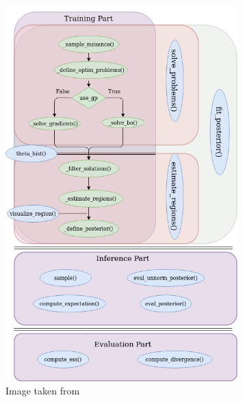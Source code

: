 \begin{figure}[!ht]
    \begin{center}
      \includegraphics[width=0.8\textwidth]{./graphs/ROMC.png}
    \end{center}
    \caption{Image taken from \cite{1708.00707}}
    \label{fig:elfi-model}
\end{figure}